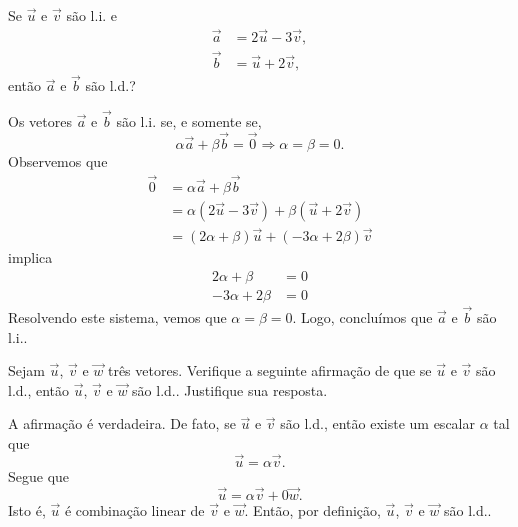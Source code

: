 \begin{exeresol}
  Se $\vec{u}$ e $\vec{v}$ são l.i. e
  \begin{align}
    \vec{a} &= 2\vec{u} - 3\vec{v},\\
    \vec{b} &= \vec{u} + 2\vec{v},
  \end{align}
  então $\vec{a}$ e $\vec{b}$ são l.d.?
\end{exeresol}
\begin{resol}
  Os vetores $\vec{a}$ e $\vec{b}$ são l.i. se, e somente se,
  \begin{equation}
    \alpha\vec{a} + \beta\vec{b} = \vec{0} \Rightarrow \alpha=\beta=0.
  \end{equation}
  Observemos que
  \begin{align}
    \vec{0} &= \alpha\vec{a}+\beta\vec{b}\\
            &= \alpha(2\vec{u} - 3\vec{v}) + \beta(\vec{u}+2\vec{v})\\
            &= (2\alpha+\beta)\vec{u} + (-3\alpha+2\beta)\vec{v}
  \end{align}
  implica
  \begin{align}
    2\alpha + \beta &= 0 \\
    -3\alpha + 2\beta &= 0
  \end{align}
  Resolvendo este sistema, vemos que $\alpha = \beta = 0$. Logo, concluímos que $\vec{a}$ e $\vec{b}$ são l.i.. 
\end{resol}

\begin{exeresol}
  Sejam $\vec{u}$, $\vec{v}$ e $\vec{w}$ três vetores. Verifique a seguinte afirmação de que se $\vec{u}$ e $\vec{v}$ são l.d., então $\vec{u}$, $\vec{v}$ e $\vec{w}$ são l.d.. Justifique sua resposta.
\end{exeresol}
\begin{resol}
  A afirmação é verdadeira. De fato, se $\vec{u}$ e $\vec{v}$ são l.d., então existe um escalar $\alpha$ tal que
  \begin{equation}
    \vec{u} = \alpha\vec{v}.
  \end{equation}
  Segue que
  \begin{equation}
    \vec{u} = \alpha\vec{v} + 0\vec{w}.
  \end{equation}
  Isto é, $\vec{u}$ é combinação linear de $\vec{v}$ e $\vec{w}$. Então, por definição, $\vec{u}$, $\vec{v}$ e $\vec{w}$ são l.d..
\end{resol}

